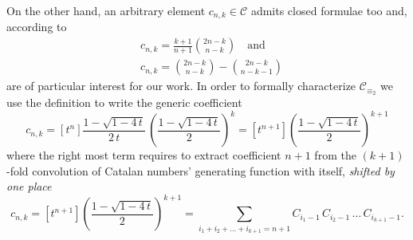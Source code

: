 On the other hand, an arbitrary element $c_{n,k}\in\mathcal{C}$
admits closed formulae too and, according to \cite{luzon:2012631}
\begin{align}
    & c_{n,k}=\frac{k+1}{n+1}{{2n-k}\choose{n-k}}\quad\text{and}
    \label{eq:catalan:array:first:identity}\\
    & c_{n,k}={{2n-k}\choose{n-k}} - {{2n-k}\choose{n-k-1}}
    \label{eq:catalan:array:second:identity}
\end{align}
are of particular interest for our work.  In order to formally characterize
$\mathcal{C}_{\equiv_{2}}$ we use the definition to write the generic coefficient
\begin{displaymath}
    c_{n,k} = [t^n] \frac{1-\sqrt{1-4\,t}}{2\,t}\,
        \left(\frac{1-\sqrt{1-4\,t}}{2}\right)^{k}
           = [t^{n+1}] \left(\frac{1-\sqrt{1-4\,t}}{2}\right)^{k+1}
\end{displaymath}
where the right most term requires to extract coefficient $n+1$ from the $(k+1)$-fold
convolution of Catalan numbers' generating function with itself, \emph{shifted
by one place}
\begin{equation}
    c_{n,k} = [t^{n+1}] \left(\frac{1-\sqrt{1-4\,t}}{2}\right)^{k+1}
            = \sum_{i_{1}+ i_{2}+ \ldots+ i_{k+1}=n+1}{
                C_{i_{1}-1}\,C_{i_{2}-1}\,\ldots\,C_{i_{k+1}-1} }.
    \label{eq:convolution:expansion:for:generic:element:in:catalan:array}
\end{equation}

